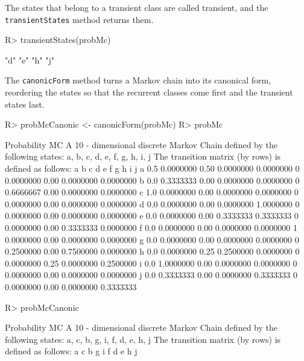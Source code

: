 \documentclass[
  nojss]{jss}
\begin{document}
The states that belong to a transient class are called transient, and the
\texttt{transientStates} method returns them.

\begin{CodeChunk}
\begin{CodeInput}
R> transientStates(probMc)
\end{CodeInput}
\begin{CodeOutput}
[1] "d" "e" "h" "j"
\end{CodeOutput}
\end{CodeChunk}

The \texttt{canonicForm} method turns a Markov chain into its canonical form, reordering the states so that the
recurrent classes come first and the transient states last.

\begin{CodeChunk}
\begin{CodeInput}
R> probMcCanonic <- canonicForm(probMc)
R> probMc
\end{CodeInput}
\begin{CodeOutput}
Probability MC 
 A  10 - dimensional discrete Markov Chain defined by the following states: 
 a, b, c, d, e, f, g, h, i, j 
 The transition matrix  (by rows)  is defined as follows: 
    a         b    c         d         e f         g    h         i         j
a 0.5 0.0000000 0.50 0.0000000 0.0000000 0 0.0000000 0.00 0.0000000 0.0000000
b 0.0 0.3333333 0.00 0.0000000 0.0000000 0 0.6666667 0.00 0.0000000 0.0000000
c 1.0 0.0000000 0.00 0.0000000 0.0000000 0 0.0000000 0.00 0.0000000 0.0000000
d 0.0 0.0000000 0.00 0.0000000 1.0000000 0 0.0000000 0.00 0.0000000 0.0000000
e 0.0 0.0000000 0.00 0.3333333 0.3333333 0 0.0000000 0.00 0.3333333 0.0000000
f 0.0 0.0000000 0.00 0.0000000 0.0000000 1 0.0000000 0.00 0.0000000 0.0000000
g 0.0 0.0000000 0.00 0.0000000 0.0000000 0 0.2500000 0.00 0.7500000 0.0000000
h 0.0 0.0000000 0.25 0.2500000 0.0000000 0 0.0000000 0.25 0.0000000 0.2500000
i 0.0 1.0000000 0.00 0.0000000 0.0000000 0 0.0000000 0.00 0.0000000 0.0000000
j 0.0 0.3333333 0.00 0.0000000 0.3333333 0 0.0000000 0.00 0.0000000 0.3333333
\end{CodeOutput}
\begin{CodeInput}
R> probMcCanonic
\end{CodeInput}
\begin{CodeOutput}
Probability MC 
 A  10 - dimensional discrete Markov Chain defined by the following states: 
 a, c, b, g, i, f, d, e, h, j 
 The transition matrix  (by rows)  is defined as follows: 
    a    c         b         g         i f         d         e    h         j

\end{CodeOutput}
\end{CodeChunk}
\end{document}
